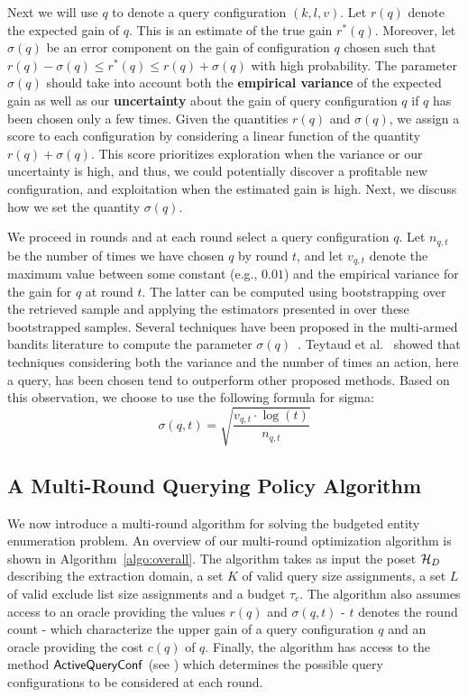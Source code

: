 Next we will use $q$ to denote a query configuration $(k,l,v)$. Let $r(q)$ denote the expected gain of $q$. This is an estimate of the true gain $r^*(q)$. Moreover, let $\sigma(q)$ be an error component on the gain of configuration $q$ chosen such that $r(q) - \sigma(q) \leq r^*(q) \leq r(q) + \sigma(q)$ with high probability. The parameter $\sigma(q)$ should take into account both the {\bf empirical variance} of the expected gain as well as our {\bf uncertainty} about the gain of query configuration $q$ if $q$ has been chosen only a few times. Given the quantities $r(q)$ and $\sigma(q)$, we assign a score to each configuration by considering a linear function of the quantity $r(q) + \sigma(q)$. This score prioritizes exploration when the variance or our uncertainty is high, and thus, we could potentially discover a profitable new configuration, and exploitation when the estimated gain is high. Next, we discuss how we set the quantity $\sigma(q)$.

We proceed in rounds and at each round select a query configuration $q$. Let $n_{q,t}$ be the number of times we have chosen $q$ by round $t$, and let $v_{q,t}$ denote the maximum value between some constant (e.g., $0.01$) and the empirical variance for the gain for $q$ at round $t$. The latter can be computed using bootstrapping over the retrieved sample and applying the estimators presented in  over these bootstrapped samples. Several techniques have been proposed in the multi-armed bandits literature to compute the parameter $\sigma(q)$~\cite{teytaud:inria-00173263}. Teytaud et al.~\cite{teytaud:inria-00173263} showed that techniques considering both the variance and the number of times an action, here a query, has been chosen tend to outperform other proposed methods. Based on this observation, we choose to use the following formula for sigma:
\begin{equation}
\label{eq:upper}
\sigma(q,t) = \sqrt{\frac{v_{q,t}\cdot\log(t)}{n_{q,t}}}
\end{equation}

\subsection{A Multi-Round Querying Policy Algorithm}
\label{sec:heuristic}
We now introduce a multi-round algorithm for solving the budgeted entity enumeration problem. An overview of our multi-round optimization algorithm is shown in Algorithm~\ref{algo:overall}. The algorithm takes as input the poset $\mathcal{H}_D$ describing the extraction domain, a set $K$ of valid query size assignments, a set $L$ of valid exclude list size assignments and a budget $\tau_c$. The algorithm also assumes access to an oracle providing the values $r(q)$ and $\sigma(q,t)$ - $t$ denotes the round count -  which characterize the upper gain of a query configuration $q$ and an oracle providing the cost $c(q)$ of $q$. Finally, the algorithm has access to the method ${\sf ActiveQueryConf}$ (see ) which determines the possible query configurations to be considered at each round.


